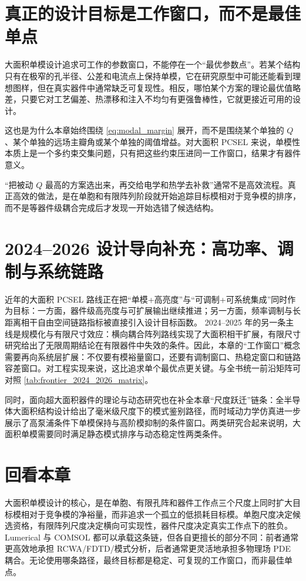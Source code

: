 \section{真正的设计目标是工作窗口，而不是最佳单点}
大面积单模设计追求可工作的参数窗口，不能停在一个“最优参数点”。若某个结构只有在极窄的孔半径、公差和电流点上保持单模，它在研究原型中可能还能看到理想图样，但在真实器件中通常缺乏可复现性。相反，哪怕某个方案的理论最优值略差，只要它对工艺偏差、热漂移和注入不均匀有更强鲁棒性，它就更接近可用的设计。

这也是为什么本章始终围绕 \cref{eq:modal_margin} 展开，而不是围绕某个单独的 $Q$、某个单独的远场主瓣角或某个单独的阈值增益。对大面积 PCSEL 来说，单模性本质上是一个多约束交集问题，只有把这些约束压进同一工作窗口，结果才有器件意义。

\begin{PitfallBox}
“把被动 $Q$ 最高的方案选出来，再交给电学和热学去补救”通常不是高效流程。真正高效的做法，是在单胞和有限阵列阶段就开始追踪目标模相对于竞争模的排序，而不是等器件级耦合完成后才发现一开始选错了候选结构。
\end{PitfallBox}

\section{2024--2026 设计导向补充：高功率、调制与系统链路}
近年的大面积 PCSEL 路线正在把“单模+高亮度”与“可调制+可系统集成”同时作为目标：一方面，器件级高亮度与可扩展输出继续推进\cite{yoshida2023}；另一方面，频率调制与长距离相干自由空间链路指标被直接引入设计目标函数\cite{inoue2025fmpcsel}。  
2024--2025 年的另一条主线是规模化与有限尺寸效应：横向耦合阵列路线实现了大面积相干扩展\cite{li2024laterallycoupledpcsel}，有限尺寸研究给出了无限周期结论在有限器件中失效的条件\cite{wang2025finitesizepcsel}。因此，本章的“工作窗口”概念需要再向系统层扩展：不仅要有模裕量窗口，还要有调制窗口、热稳定窗口和链路容差窗口。对工程实现来说，这比追求单个最优点更关键。与全书统一前沿矩阵可对照 \cref{tab:frontier_2024_2026_matrix}。

同时，面向超大面积器件的理论与动态研究也在补全本章“尺度跃迁”链条：全半导体大面积结构设计给出了毫米级尺度下的模式鉴别路径\cite{king2024verylargeareapcsel}，而时域动力学仿真进一步展示了高泵浦条件下单模保持与高阶模抑制的条件窗口\cite{radziunas2025dynamiclargesemipcsel}。两类研究合起来说明，大面积单模需要同时满足静态模式排序与动态稳定性两类条件。

\section*{回看本章}
大面积单模设计的核心，是在单胞、有限孔阵和器件工作点三个尺度上同时扩大目标模相对于竞争模的净裕量，而非追求一个孤立的低损耗目标模。单胞尺度决定候选资格，有限阵列尺度决定横向可实现性，器件尺度决定真实工作点下的胜负。Lumerical 与 COMSOL 都可以承载这条链，但各自更擅长的部分不同：前者通常更高效地承担 RCWA/FDTD/模式分析，后者通常更灵活地承担多物理场 PDE 耦合。无论使用哪条路径，最终目标都是稳定、可复现的工作窗口，而非最佳单点。

